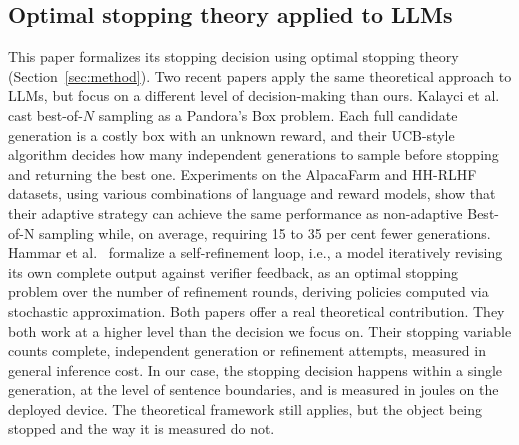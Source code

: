 \documentclass[review,12pt]{elsarticle}
\begin{document}
\subsection{Optimal stopping theory applied to LLMs}
\label{sec:related-optstop}
This paper formalizes its stopping decision using optimal stopping
theory~\cite{optimalST} (Section~\ref{sec:method}). Two recent papers apply the
same theoretical approach to LLMs, but focus on a different level of decision-making than ours. Kalayci et al.~\cite{kalayci2025optstopbestofn} cast
best-of-$N$ sampling as a Pandora's Box problem. Each full candidate
generation is a costly box with an unknown reward, and their UCB-style
algorithm decides how many independent generations to sample before
stopping and returning the best one. Experiments on the AlpacaFarm and HH-RLHF datasets, using various combinations of language and reward models, show that their adaptive strategy can achieve the same performance as non-adaptive Best-of-N sampling while, on average, requiring 15 to 35 per cent fewer generations.
Hammar et al.~\cite{hammar2026optstoprefine} formalize a
self-refinement loop, i.e., a model iteratively revising its own complete
output against verifier feedback, as an optimal stopping problem over
the number of refinement rounds, deriving policies computed via
stochastic approximation. Both papers offer a real theoretical contribution.
They both work at a higher level than the decision we focus on.
Their stopping variable counts complete, independent generation
or refinement attempts, measured in general inference cost. In our case,
the stopping decision happens within a single generation, at the level of
sentence boundaries, and is measured in joules on the deployed device.
The theoretical framework still applies, but the object being stopped and the
way it is measured do not.
\end{document}
